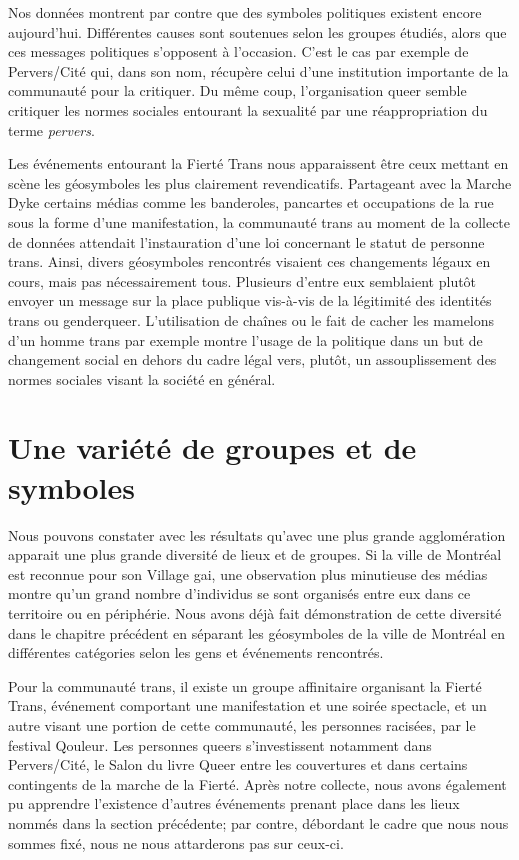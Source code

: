 Nos données montrent par contre que des symboles politiques existent encore aujourd'hui.
Différentes causes sont soutenues selon les groupes étudiés, alors que ces messages politiques s'opposent à l'occasion.
C'est le cas par exemple de Pervers/Cité qui, dans son nom, récupère celui d'une institution importante de la communauté \lgbt{} pour la critiquer.
Du même coup, l'organisation queer semble critiquer les normes sociales entourant la sexualité par une réappropriation du terme \emph{pervers}. 

Les événements entourant la Fierté Trans nous apparaissent être ceux mettant en scène les géosymboles les plus clairement revendicatifs.
Partageant avec la Marche Dyke certains médias comme les banderoles, pancartes et occupations de la rue sous la forme d'une manifestation, la communauté trans au moment de la collecte de données attendait l'instauration d'une loi concernant le statut de personne trans.
Ainsi, divers géosymboles rencontrés visaient ces changements légaux en cours, mais pas nécessairement tous.
Plusieurs d'entre eux semblaient plutôt envoyer un message sur la place publique vis-à-vis de la légitimité des identités trans ou genderqueer.
L'utilisation de chaînes ou le fait de cacher les mamelons d'un homme trans par exemple montre l'usage de la politique dans un but de changement social en dehors du cadre légal vers, plutôt, un assouplissement des normes sociales visant la société en général.

\section{Une variété de groupes et de symboles}
\label{sec:une_variete_de_groupes_et_de_symboles}
Nous pouvons constater avec les résultats qu'avec une plus grande agglomération apparait une plus grande diversité de lieux et de groupes.
Si la ville de Montréal est reconnue pour son Village gai, une observation plus minutieuse des médias \lgbt montre qu'un grand nombre d'individus se sont organisés entre eux dans ce territoire ou en périphérie.
Nous avons déjà fait démonstration de cette diversité dans le chapitre précédent en séparant les géosymboles de la ville de Montréal en différentes catégories selon les gens et événements rencontrés.

Pour la communauté trans, il existe un groupe affinitaire organisant la Fierté Trans, événement comportant une manifestation et une soirée spectacle, et un autre visant une portion de cette communauté, les personnes racisées, par le festival Qouleur.
Les personnes queers s'investissent notamment dans Pervers/Cité, le Salon du livre Queer entre les couvertures et dans certains contingents de la marche de la Fierté. 
Après notre collecte, nous avons également pu apprendre l'existence d'autres événements prenant place dans les lieux nommés dans la section précédente; par contre, débordant le cadre que nous nous sommes fixé, nous ne nous attarderons pas sur ceux-ci.


